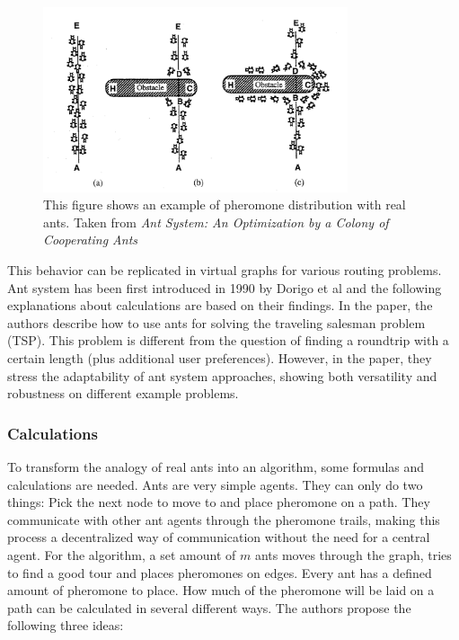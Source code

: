 \begin{figure}[H]
	\begin{centering}
		\includegraphics[width=0.8\textwidth]{bilder/antSystemExampleIllustration.png}
		\caption{This figure shows an example of pheromone distribution with real ants. Taken from \textit{Ant System: An Optimization by a Colony of Cooperating Ants}\cite{dorigo_ant_1996}}
		\label{fig:antSystemExampleIllustration}
	\end{centering}
\end{figure}


This behavior can be replicated in virtual graphs for various routing problems.
Ant system has been first introduced in 1990 by Dorigo et al\cite{dorigo_ant_1996} and the following explanations about calculations are based on their findings.
In the paper, the authors describe how to use ants for solving the traveling salesman problem (TSP).
This problem is different from the question of finding a roundtrip with a certain length (plus additional user preferences).
However, in the paper, they stress the adaptability of ant system approaches, showing both versatility and robustness on different example problems.


\subsubsection{Calculations}
\label{subsubsec:antCalculations}

To transform the analogy of real ants into an algorithm, some formulas and calculations are needed.
Ants are very simple agents. 
They can only do two things:
Pick the next node to move to and place pheromone on a path.
They communicate with other ant agents through the pheromone trails, making this process a decentralized way of communication without the need for a central agent.
For the algorithm, a set amount of $m$ ants moves through the graph, tries to find a good tour and places pheromones on edges.
Every ant has a defined amount of pheromone to place. 
How much of the pheromone will be laid on a path can be calculated in several different ways. 
The authors propose the following three ideas:

